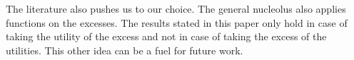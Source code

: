 \documentclass[a4paper,12pt]{article}
\theoremstyle{definition}
\theoremstyle{remark}
\begin{document}
The literature also pushes us to our choice. The general nucleolus \citep{PottersTijs1992,MaschlerPottersTijs1992} also applies functions on the excesses. The results stated in this paper only hold in case of taking the utility of the excess and not in case of taking the excess of the utilities. This other idea can be a fuel for future work.















\end{document}
